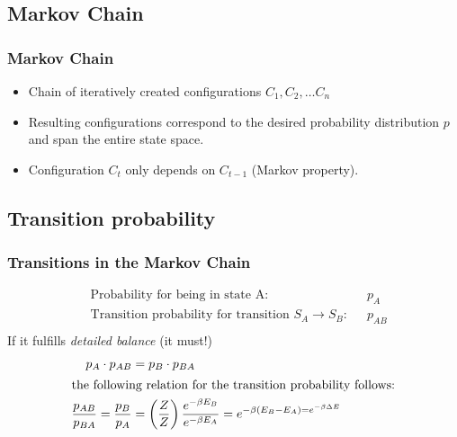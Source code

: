 \documentclass{beamer}
\begin{document}
\subsection{Markov Chain}
\begin{frame}
\frametitle{Markov Chain}
\begin{itemize}
\item Chain of iteratively created configurations $C_1, C_2, \ldots C_n$
\item Resulting configurations correspond to the desired probability distribution $p$ and span the entire state space.
\item Configuration $C_t$ only depends on $C_{t-1}$ (Markov property).
\end{itemize}
\end{frame}

\subsection{Transition probability}
\begin{frame}
\frametitle{Transitions in the Markov Chain}
\begin{align*}
&\text{Probability for being in state A: }	&& p_A\\
&\text{Transition probability for transition $S_A \rightarrow S_B$:} &&p_{AB}\\
\end{align*}
If it fulfills \textit{detailed balance} (it must!)
\begin{align*}
 p_A\cdot p_{AB} &= p_B\cdot p_{BA} \\
\intertext{the following relation for the transition probability follows:}
\frac{p_{AB}}{p_{BA}} = \frac{p_B}{p_A} &= \left(\frac{Z}{Z}\right)\frac{e^{-\beta E_B}}{e^{-\beta E_A}}  = e^{-\beta (E_B - E_A) = e^{-\beta \Delta E}}
\end{align*}
\end{frame}
\end{document}
